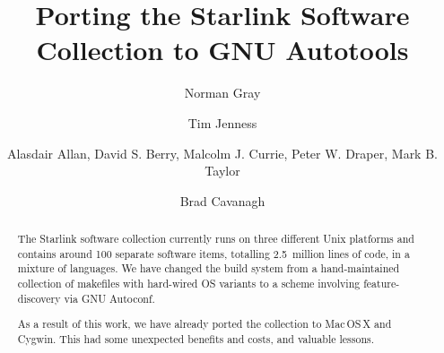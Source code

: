 \documentclass[11pt,twoside]{article}
\begin{document}

\title{Porting the Starlink Software Collection to GNU Autotools}

\author{Norman Gray}
\author{Tim Jenness}
\author{Alasdair Allan,
    David S. Berry,
    Malcolm J. Currie,
    Peter W. Draper,
    Mark B. Taylor}
\author{Brad Cavanagh}




%



\begin{abstract}
The Starlink software collection currently runs on three different
Unix platforms and contains around 100 separate software items,
totalling 2.5~million lines of code, in a mixture of languages.  We
have changed the build system from a hand-maintained collection of
makefiles with hard-wired OS variants to a scheme involving
feature-discovery via GNU Autoconf.

As a result of this work, we have already ported the collection to
Mac\,OS\,X and Cygwin.  This had some unexpected benefits and costs, and
valuable lessons.
\end{abstract}
\end{document}
